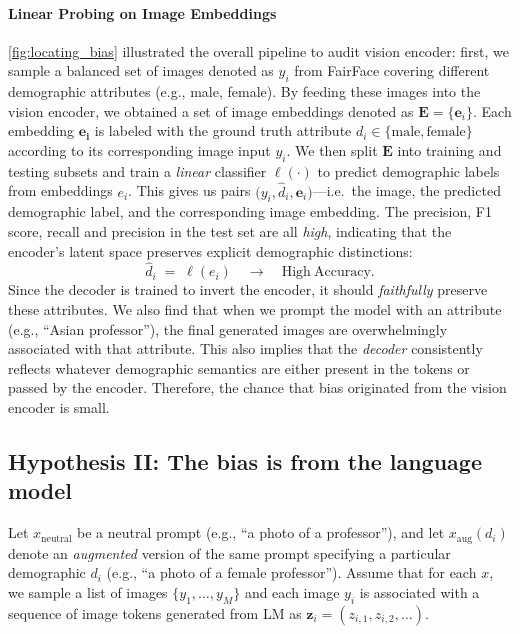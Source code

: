 \vspace{-1em}
\paragraph{Linear Probing on Image Embeddings}
\autoref{fig:locating_bias} illustrated the overall pipeline to audit vision encoder: first, we sample a balanced set of images denoted as ${y_i}$ from FairFace\cite{kärkkäinen2019fairfacefaceattributedataset} covering different demographic attributes (e.g., male, female). By feeding these images into the vision encoder, we obtained a set of image embeddings denoted as $\mathbf{E} = \{\mathbf{e}_i\}$. Each embedding $\mathbf{e_i}$ is labeled with the ground truth attribute $d_i \in \{ \text{male}, \text{female} \}$ according to its corresponding image input $y_i$. We then split $\mathbf{E}$ into training and testing subsets and train a \emph{linear} classifier $\ell(\cdot)$ to predict demographic labels from embeddings $e_i$. This gives us pairs $\bigl(y_i, \hat{d}_i, \mathbf{e}_i\bigr)$—i.e.\ the image, the predicted demographic label, and the corresponding image embedding. The precision, F1 score, recall and precision in the test set are all \emph{high}, indicating that the encoder’s latent space preserves explicit demographic distinctions:
\[
\widehat{d}_i \;=\; \ell(e_i) \quad \rightarrow \quad \mathrm{High\ Accuracy}.
\]
Since the decoder is trained to invert the encoder, it should \emph{faithfully} preserve these attributes. We also find that when we prompt the model with an attribute (e.g., ``Asian professor''), the final generated images are overwhelmingly associated with that attribute. This also implies that the \emph{decoder} consistently reflects whatever demographic semantics are either present in the tokens or passed by the encoder. Therefore, the chance that bias originated from the vision encoder is small. 
\vspace{-1em}
\subsection{Hypothesis II: The bias is from the language model}
Let $x_{\text{neutral}}$ be a neutral prompt (e.g., ``a photo of a professor''), and let $x_{\text{aug}}(d_i)$ denote an \emph{augmented} version of the same prompt specifying a particular demographic $d_i$ (e.g., ``a photo of a female professor''). Assume that for each $x$, we sample a list of images $\{y_1, \ldots, y_M\}$ and each image $y_i$ is associated with a sequence of image tokens generated from LM as $\mathbf{z}_i = (z_{i,1}, z_{i,2}, \ldots)$.

